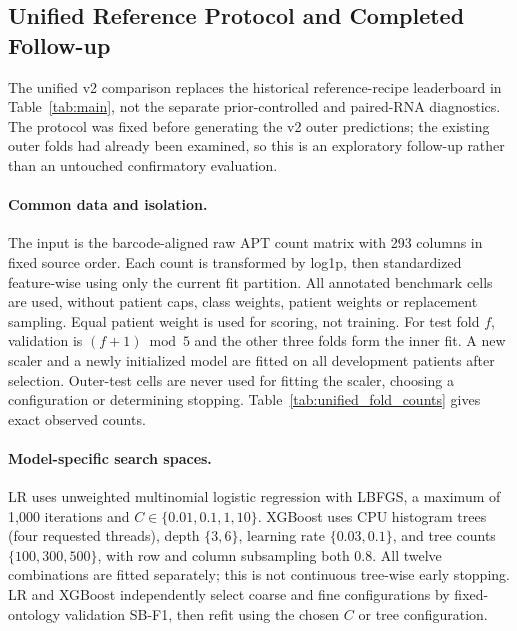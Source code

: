 \subsection{Unified Reference Protocol and Completed Follow-up}
\label{sec:appendix:unified_v2}

The unified v2 comparison replaces the historical reference-recipe leaderboard
in Table~\ref{tab:main}, not the separate prior-controlled and paired-RNA
diagnostics. The protocol was fixed before generating the v2 outer predictions;
the existing outer folds had already been examined, so this is an exploratory
follow-up rather than an untouched confirmatory evaluation.

\paragraph{Common data and isolation.}
The input is the barcode-aligned raw APT count matrix with 293 columns in
fixed source order. Each count is transformed by log1p, then standardized
feature-wise using only the current fit partition. All annotated benchmark
cells are used, without patient caps, class weights, patient weights or
replacement sampling. Equal patient weight is used for scoring, not training.
For test fold $f$, validation is $(f+1)\bmod 5$ and the other three folds
form the inner fit. A new scaler and a newly initialized model are fitted
on all development patients after selection. Outer-test cells are never used
for fitting the scaler, choosing a configuration or determining stopping.
Table~\ref{tab:unified_fold_counts} gives exact observed counts.


\paragraph{Model-specific search spaces.}
LR uses unweighted multinomial logistic regression with LBFGS, a maximum of
1{,}000 iterations and $C\in\{0.01,0.1,1,10\}$. XGBoost uses CPU histogram
trees (four requested threads), depth $\{3,6\}$, learning rate
$\{0.03,0.1\}$, and tree counts $\{100,300,500\}$, with row and column
subsampling both 0.8. All twelve combinations are fitted separately; this
is not continuous tree-wise early stopping. LR and XGBoost independently
select coarse and fine configurations by fixed-ontology validation SB-F1,
then refit using the chosen $C$ or tree configuration.

